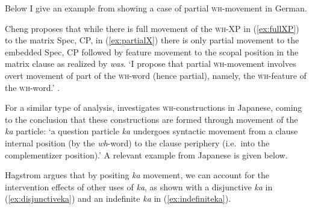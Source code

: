 \documentclass[output=paper,colorlinks,citecolor=brown,
]{langscibook}
\begin{document}
Below I give an example from \citet{Cheng:2000b} showing a case of partial \textsc{wh-}movement in German.  

\ea
{}
\z
\z

Cheng proposes that while there is full movement of the \textsc{wh}-XP in (\ref{ex:fullXP}) to the matrix Spec, CP, in (\ref{ex:partialX}) there is only partial movement to the embedded Spec, CP followed by feature movement to the scopal position in the matrix clause as realized by \textit{was}.  `I propose that partial \textsc{wh}-movement involves overt movement of part of the \textsc{wh}-word (hence partial), namely, the \textsc{wh}-feature of the \textsc{wh}-word.' \citep[77]{Cheng:2000b}.

For a similar type of analysis, \citet{Hagstrom:2000} investigates \textsc{wh}-constructions in Japanese, coming to the conclusion that these constructions are formed through movement of the \textit{ka} particle: `a question particle \textit{ka} undergoes syntactic movement from a clause internal position (by the  \textit{wh}-word) to the clause periphery (i.e.\ into the complementizer position).'
A relevant example from Japanese is given below.

\z

Hagstrom argues that by positing \textit{ka} movement, we can account for the intervention effects of other uses of \textit{ka}, as shown with a disjunctive  \textit{ka} in (\ref{ex:disjunctiveka}) and an indefinite  \textit{ka} in (\ref{ex:indefiniteka}).
\end{document}
